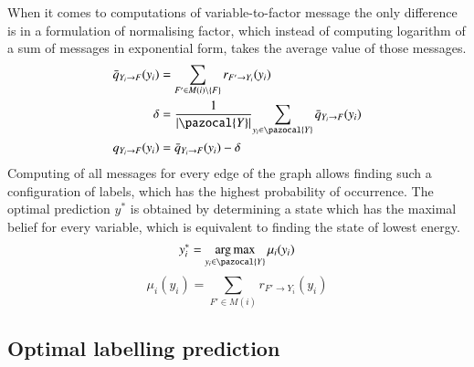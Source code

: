 When it comes to computations of variable-to-factor message the only difference is in a formulation of normalising factor, which instead of computing logarithm of a sum of messages in exponential form, takes the average value of those messages. 
\begin{align}
    \bar{q}_{Y_i\rightarrow F}(y_i) &= \sum_{F' \in M(i) \setminus \left \{ F \right \} }{ r_{F' \rightarrow Y_i}(y_i)} \\
    \delta &= \frac{1}{\left |\pazocal{Y} \right |}{\sum_{y_i \in \pazocal{Y}}{\bar{q}_{Y_i\rightarrow F}(y_i)}} \\
    q_{Y_i\rightarrow F}(y_i) &= \bar{q}_{Y_i\rightarrow F}(y_i) - \delta
\end{align}
Computing of all messages for every edge of the graph allows finding such a configuration of labels, which has the highest probability of occurrence. The optimal prediction $y^*$ is obtained by determining a state which has the maximal belief for every variable, which is equivalent to finding the state of lowest energy.
\begin{equation}
   y_{i}^{*} = \argmax_{y_i \in \pazocal{Y}}{\mu_i (y_i)}
\end{equation}
\begin{equation}
   \mu_i (y_i) = \sum_{F' \in M(i)}{ r_{F' \rightarrow Y_i}(y_i)}
\end{equation}

\subsection{Optimal labelling prediction}

